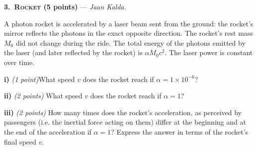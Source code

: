 \textbf{3.\ \textsc{Rocket} (5 points)} --- \textit{Jaan Kalda.}

A photon rocket is accelerated by a laser beam sent from the ground: the
rocket's mirror reflects the photons in the exact opposite direction. The
rocket's rest mass $M_0$ did not change during the ride. The total energy of the
photons emitted by the laser (and later reflected by the rocket) is
$\alpha M_0 c^2$. The laser power is constant over time.

\textbf{i)} \textit{(1 point)}What speed $v$ does the rocket reach if
$\alpha = 1 \times 10^{-6}$?

\textbf{ii)} \textit{(2 points)} What speed $v$ does the rocket reach if
$\alpha = 1$?

\textbf{iii)} \textit{(2 points)} How many times does the rocket's acceleration,
as perceived by passengers (i.e. the inertial force acting on them) differ at
the beginning and at the end of the acceleration if $\alpha = 1$? Express the
answer in terms of the rocket's final speed $v$.
